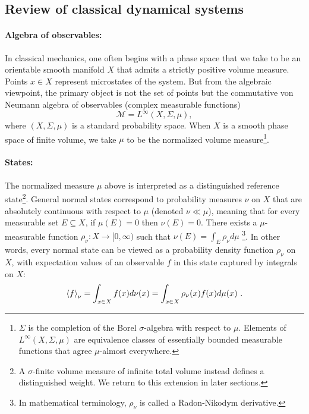 \documentclass[a4paper,11pt]{article}
\theoremstyle{definition}
\begin{document}
\subsection{Review of classical dynamical systems}\label{subsec:classical-definitions}

\paragraph{Algebra of observables:} In classical mechanics, one often begins with a phase space that we take to be an orientable smooth manifold \(X\) that admits a strictly positive volume measure. Points \(x\in X\) represent microstates of the system. But from the algebraic viewpoint, the primary object is not the set of points but the commutative von Neumann algebra of observables (complex measurable functions)
\[
\mathcal M=L^\infty(X,\Sigma,\mu),
\]
where \((X,\Sigma,\mu)\) is a standard probability space. When $X$ is a smooth phase space of finite volume, we take $\mu$ to be the normalized volume measure\footnote{$\Sigma$ is the completion of the Borel $\sigma$-algebra with respect to $\mu$. Elements of $L^\infty(X,\Sigma,\mu)$ are equivalence classes of essentially bounded measurable functions that agree $\mu$-almost everywhere.}.


\paragraph{States:} The normalized measure $\mu$ above is interpreted as a distinguished reference state\footnote{A $\sigma$-finite volume measure of infinite total volume instead defines a distinguished weight. We return to this extension in later sections.}. General normal states correspond to probability measures $\nu$ on $X$ that are absolutely continuous with respect to $\mu$ (denoted $\nu\ll \mu$), meaning that for every measurable set $E\subseteq X$, if $\mu(E)=0$ then $\nu(E)=0$.
There exists a $\mu$-measurable function $\rho_\nu:X\to [0,\infty)$ such that $\nu(E)=\int_E \rho_\nu d\mu$ \footnote{In mathematical terminology, $\rho_\nu$ is called a Radon-Nikodym derivative.}. In other words, every normal state can be viewed as a probability density function $\rho_\nu$ on $X$, with expectation values of an observable $f$ in this state captured by integrals on $X$: 
\begin{align}
\braket{f}_\nu=\int_{x\in X}f(x) d\nu(x)=\int_{x\in X} \rho_\nu(x) f(x) d\mu(x)\ .
\end{align}
\end{document}
